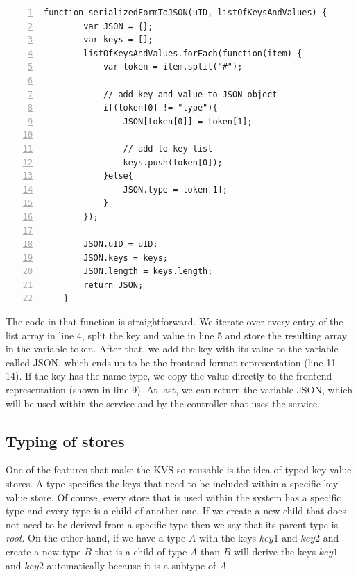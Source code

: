 \begin{lstlisting}[numbers=left,caption={The translation from the backend data format to the frontend data format within the key value service},label=keyTranslation,frame=tlbr,breaklines]
   function serializedFormToJSON(uID, listOfKeysAndValues) {
        var JSON = {};
        var keys = [];
        listOfKeysAndValues.forEach(function(item) {
            var token = item.split("#");

            // add key and value to JSON object
            if(token[0] != "type"){
                JSON[token[0]] = token[1];

                // add to key list
                keys.push(token[0]);
            }else{
                JSON.type = token[1];
            }
        });

        JSON.uID = uID;
        JSON.keys = keys;
        JSON.length = keys.length;
        return JSON;
    }
\end{lstlisting}

The code in that function is straightforward. We iterate over every entry of the list array in line 4, split the key and value in line 5 and store the resulting array in the variable token.
After that, we add the key with its value to the variable called JSON, which ends up to be the frontend format representation (line 11-14). If the key has the name type, we copy the value directly to the frontend representation (shown in line 9). At last, we can return the variable JSON, which will be used within the service and by the controller that uses the service.

\subsection{Typing of stores}
\label{typedKVS}
One of the features that make the \ac{KVS} so reusable is the idea of typed key-value stores. A type specifies the keys that need to be included within a specific key-value store. Of course, every store that is used within the system has a specific type and every type is a child of another one. If we create a new child that does not need to be derived from a specific type then we say that its parent type is \emph{root}.
On the other hand, if we have a type $A$ with the keys $key1$ and $key2$ and create a new type $B$ that is a child of type $A$ than $B$ will derive the keys $key1$ and $key2$ automatically because it is a subtype of $A$.

